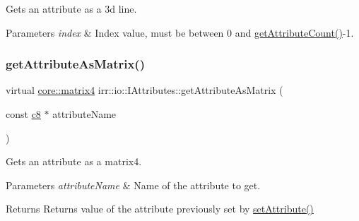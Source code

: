 Gets an attribute as a 3d line. 


\begin{DoxyParams}{Parameters}
{\em index} & Index value, must be between 0 and \hyperlink{classirr_1_1io_1_1IAttributes_a796bdd9440ee7ba0b6742a90a82870b6}{get\+Attribute\+Count()}-\/1. \\
\hline
\end{DoxyParams}
\mbox{\label{classirr_1_1io_1_1IAttributes_a0329ce7827096c56f3c7e905afe04ced}} 
\subsubsection{\texorpdfstring{get\+Attribute\+As\+Matrix()}{getAttributeAsMatrix()}\hspace{0.1cm}{\footnotesize\ttfamily [1/4]}}
{\footnotesize\ttfamily virtual \hyperlink{namespaceirr_1_1core_a4c9d4e29899535971052810954a14431}{core\+::matrix4} irr\+::io\+::\+I\+Attributes\+::get\+Attribute\+As\+Matrix (\begin{DoxyParamCaption}\item[{const \hyperlink{namespaceirr_a9395eaea339bcb546b319e9c96bf7410}{c8} $\ast$}]{attribute\+Name }\end{DoxyParamCaption})\hspace{0.3cm}{\ttfamily [pure virtual]}}



Gets an attribute as a matrix4. 


\begin{DoxyParams}{Parameters}
{\em attribute\+Name} & Name of the attribute to get. \\
\hline
\end{DoxyParams}
\begin{DoxyReturn}{Returns}
Returns value of the attribute previously set by \hyperlink{classirr_1_1io_1_1IAttributes_a03fa31acb481ae23678676cc183f09a6}{set\+Attribute()} 
\end{DoxyReturn}
\mbox{\label{classirr_1_1io_1_1IAttributes_a0329ce7827096c56f3c7e905afe04ced}} 
